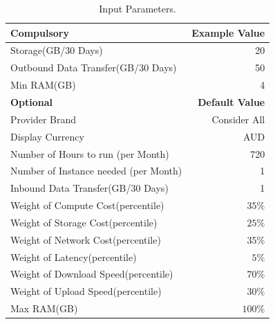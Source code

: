 \begin{table}[!ht]
\begin{center}\caption{Input Parameters.} \label{table:input_param}
\begin{tabular}{|l|r|}
\hline
\textbf{Compulsory }&  \textbf{Example Value } \\
\hline Storage(GB/30 Days) & 20 \\
\hline Outbound Data Transfer(GB/30 Days) & 50 \\
\hline Min RAM(GB) & 4 \\
\hline \textbf{Optional } & \textbf{Default Value} \\
\hline Provider Brand & Consider All \\
\hline Display Currency  & AUD \\

\hline Number of Hours to run (per Month) & 720 \\
\hline Number of Instance needed (per Month) & 1 \\
\hline Inbound Data Transfer(GB/30 Days) & 1  \\
\hline Weight of Compute Cost(percentile) & $35\%$ \\
\hline Weight of Storage Cost(percentile) & $25\%$ \\
\hline Weight of Network Cost(percentile) &  $35\%$\\
\hline Weight of Latency(percentile) & $5\%$ \\
\hline Weight of Download Speed(percentile) & $70\%$ \\
\hline Weight of Upload Speed(percentile) & $30\%$ \\
\hline Max RAM(GB) & $100\%$ \\

\hline
\end{tabular}
\end{center}
\end{table}


